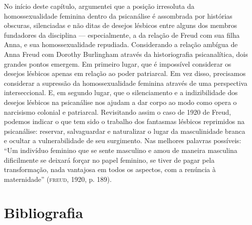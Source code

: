 No início deste capítulo, argumentei que a posição irresoluta da
homossexualidade feminina dentro da psicanálise é assombrada por
histórias obscuras, silenciadas e não ditas de desejos lésbicos entre
alguns dos membros fundadores da disciplina --- especialmente, a da
relação de Freud com sua filha Anna, e sua homossexualidade repudiada.
Considerando a relação ambígua de Anna Freud com Dorothy Burlingham
através da historiografia psicanalítica, dois grandes pontos emergem. Em
primeiro lugar, que é impossível considerar os desejos lésbicos apenas
em relação ao poder patriarcal. Em vez disso, precisamos considerar a
supressão da homossexualidade feminina através de uma perspectiva
interseccional. E, em segundo lugar, que o silenciamento e a
indizibilidade dos desejos lésbicos na psicanálise nos ajudam a dar
corpo ao modo como opera o narcisismo colonial e patriarcal. Revisitando
assim o caso de 1920 de Freud, podemos indicar o que tem sido o trabalho
dos fantasmas lésbicos reprimidos na psicanálise: reservar, salvaguardar
e naturalizar o lugar da masculinidade branca e ocultar a
vulnerabilidade de seu surgimento. Nas melhores palavras possíveis: ``Um
indivíduo feminino que se sente masculino e amou de maneira masculina
dificilmente se deixará forçar no papel feminino, se tiver de pagar pela
transformação, nada vantajosa em todos os aspectos, com a renúncia à
maternidade'' (\textsc{freud}, 1920, p. 189).

\pagebreak

\section{Bibliografia}

